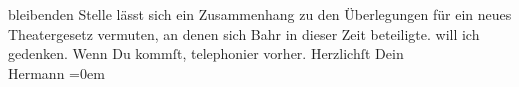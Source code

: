 \begin{ledgroupsized}[t]{13cm}
{{{                  bleibenden Stelle lässt sich ein Zusammenhang zu den Überlegungen für ein neues
                  Theatergesetz vermuten, an denen sich Bahr in
                  dieser Zeit beteiligte.}}}\label{K_L01219_3h} will ich gedenken. Wenn Du kommſt, telephonier
               vorher. Herzlichſt\pend
           \pstart
           Dein{\\[\baselineskip]}\spacefill\mbox{Hermann}\pend
           \leftskip=0em{}\endnumbering{}\end{ledgroupsized}  \newcommand{\dateiname}{L01219}\newcommand{\titel}{Hermann Bahr an Arthur Schnitzler, 15. 5. 1902}\newcommand{\editorInnen}{ Kurt Ifkovits,  Martin Anton Müller}
            \footnotesize
\begin{ledgroupsized}[t]{11.5cm}
\end{ledgroupsized}
         
      